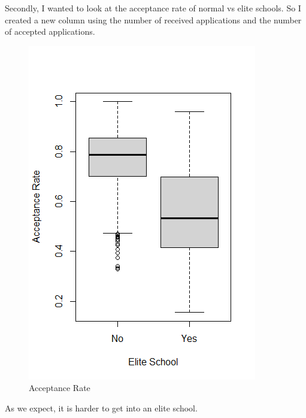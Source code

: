\documentclass{article}
\begin{document}
Secondly, I wanted to look at the acceptance rate of normal vs elite schools. So I created a new column using the number of received applications and the number of accepted applications.\\

\begin{figure}[t]
    \centering
    \includegraphics[width=0.5\linewidth]{Acceptance Rate vs Elite School.png}
    \caption{Acceptance Rate}
    \label{fig:enter-label}
\end{figure}
As we expect, it is harder to get into an elite school.
\end{document}

